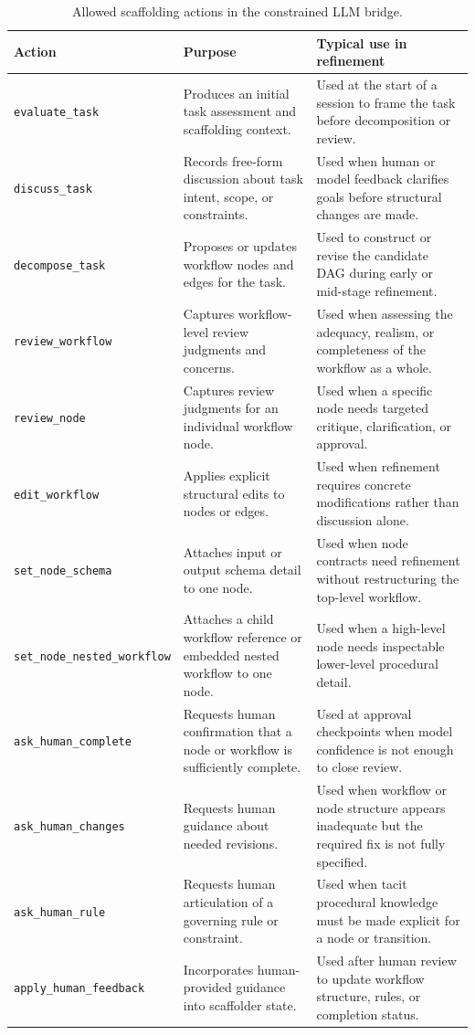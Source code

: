 \begin{table}[htbp]
\centering
\caption{Allowed scaffolding actions in the constrained LLM bridge.}
\begin{tabular}{p{3.2cm} p{4.6cm} p{6.0cm}}
\hline
\textbf{Action} & \textbf{Purpose} & \textbf{Typical use in refinement} \\
\hline
\texttt{evaluate\_task} & Produces an initial task assessment and scaffolding context. & Used at the start of a session to frame the task before decomposition or review. \\
\texttt{discuss\_task} & Records free-form discussion about task intent, scope, or constraints. & Used when human or model feedback clarifies goals before structural changes are made. \\
\texttt{decompose\_task} & Proposes or updates workflow nodes and edges for the task. & Used to construct or revise the candidate DAG during early or mid-stage refinement. \\
\texttt{review\_workflow} & Captures workflow-level review judgments and concerns. & Used when assessing the adequacy, realism, or completeness of the workflow as a whole. \\
\texttt{review\_node} & Captures review judgments for an individual workflow node. & Used when a specific node needs targeted critique, clarification, or approval. \\
\texttt{edit\_workflow} & Applies explicit structural edits to nodes or edges. & Used when refinement requires concrete modifications rather than discussion alone. \\
\texttt{set\_node\_schema} & Attaches input or output schema detail to one node. & Used when node contracts need refinement without restructuring the top-level workflow. \\
\texttt{set\_node\_nested\_workflow} & Attaches a child workflow reference or embedded nested workflow to one node. & Used when a high-level node needs inspectable lower-level procedural detail. \\
\texttt{ask\_human\_complete} & Requests human confirmation that a node or workflow is sufficiently complete. & Used at approval checkpoints when model confidence is not enough to close review. \\
\texttt{ask\_human\_changes} & Requests human guidance about needed revisions. & Used when workflow or node structure appears inadequate but the required fix is not fully specified. \\
\texttt{ask\_human\_rule} & Requests human articulation of a governing rule or constraint. & Used when tacit procedural knowledge must be made explicit for a node or transition. \\
\texttt{apply\_human\_feedback} & Incorporates human-provided guidance into scaffolder state. & Used after human review to update workflow structure, rules, or completion status. \\
\hline
\end{tabular}
\end{table}
